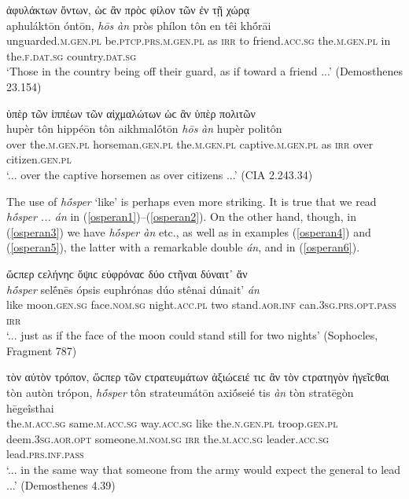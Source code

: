\begin{exe}
\ex ἀφυλάκτων ὄντων, ὡϲ ἂν πρὸϲ φίλον τῶν ἐν τῇ χώρᾳ\\
\gll aphuláktōn óntōn, \emph{hōs} \emph{àn} pròs phílon tôn en têi khṓrāi\\
unguarded.\textsc{m.gen.pl} be.\textsc{ptcp.prs.m.gen.pl} as \textsc{irr} to friend.\textsc{acc.sg} the.\textsc{m.gen.pl} in the.\textsc{f.dat.sg} country.\textsc{dat.sg}\\
\trans `Those in the country being off their guard, as if toward a friend ...' (Demosthenes 23.154)
\label{hosan59}
\end{exe}

\begin{exe}
\ex ὑπὲρ τῶν ἱππέων τῶν αἰχμαλώτων ὡϲ ἂν ὑπὲρ πολιτῶν\\
\gll hupèr tôn hippéōn tôn aikhmalṓtōn \emph{hōs} \emph{àn} hupèr politôn\\
over the.\textsc{m.gen.pl} horseman.\textsc{gen.pl} the.\textsc{m.gen.pl} captive.\textsc{m.gen.pl} as \textsc{irr} over citizen.\textsc{gen.pl}\\
\trans `... over the captive horsemen as over citizens ...' (CIA 2.243.34)
\label{hosan60}
\end{exe}

The use of \emph{hṓsper} `like' is perhaps even more striking. It is true that we read \textit{hṓsper ... án} in (\ref{osperan1})--(\ref{osperan2}). On the other hand, though, in (\ref{osperan3}) we have \textit{hṓsper àn} etc., as well as in examples (\ref{osperan4}) and (\ref{osperan5}), the latter with a remarkable double \emph{án}, and in (\ref{osperan6}).

\begin{exe}
\ex ὥϲπερ ϲελήνηϲ ὄψιϲ εὐφρόναϲ δύο ϲτῆναι δύναιτ᾽ ἄν\\
\gll \emph{hṓsper} selḗnēs ópsis euphrónas dúo stênai dúnait' \emph{án}\\
like moon.\textsc{gen.sg} face.\textsc{nom.sg} night.\textsc{acc.pl} two stand.\textsc{aor.inf} can.\textsc{3sg.prs.opt.pass} \textsc{irr}\\
\trans `... just as if the face of the moon could stand still for two nights' (Sophocles, Fragment 787)
\label{osperan1}
\end{exe}

\begin{exe}
\ex τὸν αὐτὸν τρόπον, ὥϲπερ τῶν ϲτρατευμάτων ἀξιώϲειέ τιϲ ἂν τὸν ϲτρατηγὸν ἡγεῖϲθαι\\
\gll tòn autòn trópon, \emph{hṓsper} tôn strateumátōn axiṓseié tis \emph{àn} tòn stratēgòn hēgeîsthai\\
the.\textsc{m.acc.sg} same.\textsc{m.acc.sg} way.\textsc{acc.sg} like the.\textsc{n.gen.pl} troop.\textsc{gen.pl} deem.\textsc{3sg.aor.opt} someone.\textsc{m.nom.sg} \textsc{irr} the.\textsc{m.acc.sg} leader.\textsc{acc.sg} lead.\textsc{prs.inf.pass}\\
\trans `... in the same way that someone from the army would expect the general to lead ...' (Demosthenes 4.39)
\label{osperan2}
\end{exe}

